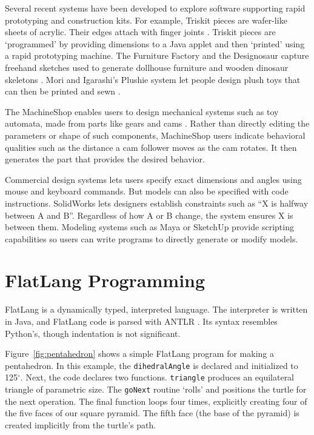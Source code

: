 \documentclass[times, 10pt,twocolumn]{article}
\begin{document}
Several recent systems have been developed to explore software
supporting rapid prototyping and construction kits. For example,
Triskit pieces are wafer-like sheets of acrylic. Their edges attach
with finger joints \cite{martin-triskit}. Triskit pieces are
`programmed' by providing dimensions to a Java applet and then
`printed' using a rapid prototyping machine. The Furniture Factory and
the Designosaur capture freehand sketches used to generate dollhouse
furniture and wooden dinosaur skeletons \cite{oh-fab}. Mori and
Igarashi's Plushie system let people design plush toys that can then
be printed and sewn \cite{mori-plushie}.

The MachineShop enables users to design mechanical systems such as toy
automata, made from parts like gears and cams
\cite{blauvelt-automata}. Rather than directly editing the parameters
or shape of such components, MachineShop users indicate behavioral
qualities such as the distance a cam follower moves as the cam
rotates. It then generates the part that provides the desired
behavior.

Commercial design systems lets users specify exact dimensions and
angles using mouse and keyboard commands. But models can also be
specified with code instructions. \nohyphens{SolidWorks} lets
designers establish constraints such as ``X is halfway between A and
B''. Regardless of how A or B change, the system ensures X is between
them. Modeling systems such as Maya or SketchUp provide scripting
capabilities so users can write programs to directly generate or
modify models.

\section{\nohyphens{FlatLang} Programming}

\nohyphens{FlatLang} is a dynamically typed, interpreted language. The
interpreter is written in Java, and FlatLang code is parsed with ANTLR
\cite{parr-antlr}. Its syntax resembles Python's, though indentation
is not significant.

Figure~\ref{fig:pentahedron} shows a simple \nohyphens{FlatLang}
program for making a pentahedron. In this example, the
\textnhtt{dihedralAngle} is declared and initialized to
125$^\circ$. Next, the code declares two
functions. \textnhtt{triangle} produces an equilateral triangle of
parametric size. The \textnhtt{goNext} routine `rolls' and positions
the turtle for the next operation. The final function loops four
times, explicitly creating four of the five faces of our square
pyramid. The fifth face (the base of the pyramid) is created
implicitly from the turtle's path.
\end{document}
